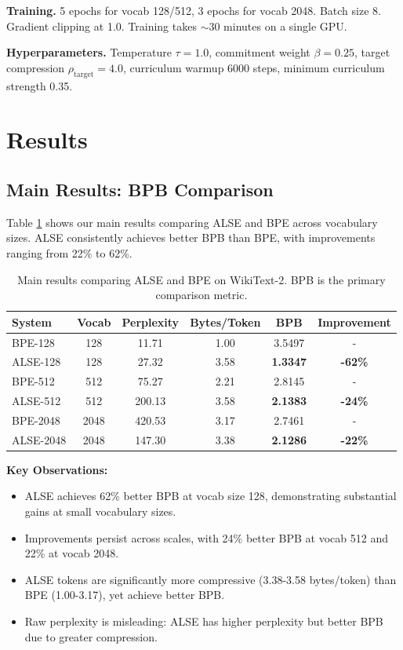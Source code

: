 \documentclass{article}
\begin{document}
\textbf{Training.} 5 epochs for vocab 128/512, 3 epochs for vocab 2048. Batch size 8. Gradient clipping at 1.0. Training takes $\sim$30 minutes on a single GPU.

\textbf{Hyperparameters.} Temperature $\tau=1.0$, commitment weight $\beta=0.25$, target compression $\rho_{\text{target}}=4.0$, curriculum warmup 6000 steps, minimum curriculum strength 0.35.

\section{Results}

\subsection{Main Results: BPB Comparison}

Table \ref{tab:main_results} shows our main results comparing ALSE and BPE across vocabulary sizes. ALSE consistently achieves better BPB than BPE, with improvements ranging from 22\% to 62\%.

\begin{table}[h]
\centering
\caption{Main results comparing ALSE and BPE on WikiText-2. BPB is the primary comparison metric.}
\label{tab:main_results}
\begin{tabular}{lccccc}
\toprule
System & Vocab & Perplexity & Bytes/Token & BPB & Improvement \\
\midrule
BPE-128 & 128 & 11.71 & 1.00 & 3.5497 & - \\
ALSE-128 & 128 & 27.32 & 3.58 & \textbf{1.3347} & \textbf{-62\%} \\
\midrule
BPE-512 & 512 & 75.27 & 2.21 & 2.8145 & - \\
ALSE-512 & 512 & 200.13 & 3.58 & \textbf{2.1383} & \textbf{-24\%} \\
\midrule
BPE-2048 & 2048 & 420.53 & 3.17 & 2.7461 & - \\
ALSE-2048 & 2048 & 147.30 & 3.38 & \textbf{2.1286} & \textbf{-22\%} \\
\bottomrule
\end{tabular}
\end{table}

\textbf{Key Observations:}
\begin{itemize}
    \item ALSE achieves 62\% better BPB at vocab size 128, demonstrating substantial gains at small vocabulary sizes.
    \item Improvements persist across scales, with 24\% better BPB at vocab 512 and 22\% at vocab 2048.
    \item ALSE tokens are significantly more compressive (3.38-3.58 bytes/token) than BPE (1.00-3.17), yet achieve better BPB.
    \item Raw perplexity is misleading: ALSE has higher perplexity but better BPB due to greater compression.
\end{itemize}
\end{document}

